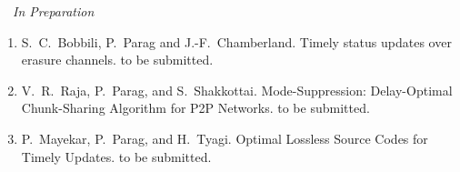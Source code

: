\documentclass[11pt]{article}
\newcommand{\blankline}{\quad\pagebreak[2]}
\begin{document}
\blankline
$\quad${\it In Preparation}
\begin{enumerate}
\addtocounter{enumi}{6}
	
\item[{\bf [J12]}] S.~C.~Bobbili, P.~Parag and J.-F.~Chamberland.
\newblock Timely status updates over erasure channels.
	to be submitted.
	
\item[{\bf [J11]}] V.~R.~Raja, P.~Parag, and S.~Shakkottai. 
\newblock  Mode-Suppression: Delay-Optimal Chunk-Sharing Algorithm for P2P Networks. 
	to be submitted.
	
\item[{\bf [J10]}] P.~Mayekar, P.~Parag, and H.~Tyagi.
\newblock Optimal Lossless Source Codes for Timely Updates. 
	to be submitted. 
	
\end{enumerate}
\end{document}
